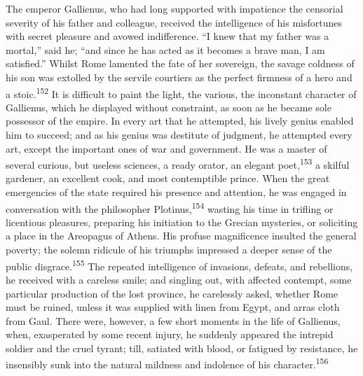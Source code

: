 

The emperor Gallienus, who had long supported with impatience the
censorial severity of his father and colleague, received the
intelligence of his misfortunes with secret pleasure and avowed
indifference. “I knew that my father was a mortal,” said he; “and
since he has acted as it becomes a brave man, I am satisfied.”
Whilst Rome lamented the fate of her sovereign, the savage
coldness of his son was extolled by the servile courtiers as the
perfect firmness of a hero and a stoic.\textsuperscript{152} It is difficult to
paint the light, the various, the inconstant character of
Gallienus, which he displayed without constraint, as soon as he
became sole possessor of the empire. In every art that he
attempted, his lively genius enabled him to succeed; and as his
genius was destitute of judgment, he attempted every art, except
the important ones of war and government. He was a master of
several curious, but useless sciences, a ready orator, an elegant
poet,\textsuperscript{153} a skilful gardener, an excellent cook, and most
contemptible prince. When the great emergencies of the state
required his presence and attention, he was engaged in
conversation with the philosopher Plotinus,\textsuperscript{154} wasting his time
in trifling or licentious pleasures, preparing his initiation to
the Grecian mysteries, or soliciting a place in the Areopagus of
Athens. His profuse magnificence insulted the general poverty;
the solemn ridicule of his triumphs impressed a deeper sense of
the public disgrace.\textsuperscript{155} The repeated intelligence of invasions,
defeats, and rebellions, he received with a careless smile; and
singling out, with affected contempt, some particular production
of the lost province, he carelessly asked, whether Rome must be
ruined, unless it was supplied with linen from Egypt, and arras
cloth from Gaul. There were, however, a few short moments in the
life of Gallienus, when, exasperated by some recent injury, he
suddenly appeared the intrepid soldier and the cruel tyrant;
till, satiated with blood, or fatigued by resistance, he
insensibly sunk into the natural mildness and indolence of his
character.\textsuperscript{156}

